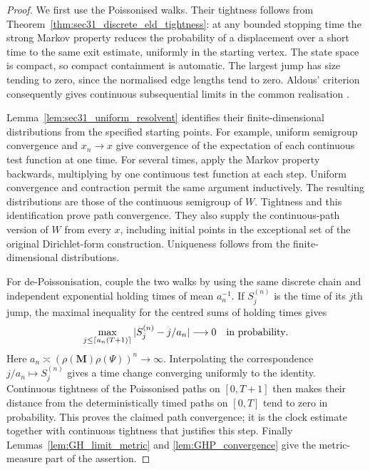 \documentclass{article}
\theoremstyle{plain}
\theoremstyle{definition}
\begin{document}
\begingroup\color{red}
\begin{proof}
We first use the Poissonised walks. Their tightness follows from
Theorem~\ref{thm:sec31_discrete_eld_tightness}: at any bounded stopping
time the strong Markov property reduces the probability of a displacement
over a short time to the same exit estimate, uniformly in the starting
vertex. The state space is compact, so compact containment is automatic.
The largest jump has size tending to zero, since the normalised edge
lengths tend to zero. Aldous' criterion consequently gives continuous
subsequential limits in the common realisation
\cite{aldous1978stopping,billingsley1999convergence}.

Lemma~\ref{lem:sec31_uniform_resolvent} identifies their finite-dimensional
distributions from the specified starting points. For example, uniform
semigroup convergence and $x_n\to x$ give convergence of the expectation
of each continuous test function at one time. For several times, apply
the Markov property backwards, multiplying by one continuous test
function at each step. Uniform convergence and contraction permit the
same argument inductively. The resulting distributions are those of the
continuous semigroup of $W$. Tightness and this identification prove
path convergence. They also supply the continuous-path version of $W$
from every $x$, including initial points in the exceptional set of the
original Dirichlet-form construction. Uniqueness follows from the
finite-dimensional distributions.

For de-Poissonisation, couple the two walks by using the same discrete
chain and independent exponential holding times of mean $a_n^{-1}$.
If $S_j^{(n)}$ is the time of its $j$th jump, the maximal inequality for
the centred sums of holding times gives
\[
\max_{j\le \lceil a_n(T+1)\rceil}
|S_j^{(n)}-j/a_n|\longrightarrow0
\quad\hbox{in probability}.
\]
Here $a_n\asymp(\rho(\mathbf M)\rho(\Psi))^n\to\infty$.
Interpolating the correspondence $j/a_n\mapsto S_j^{(n)}$ gives a time
change converging uniformly to the identity. Continuous tightness of
the Poissonised paths on $[0,T+1]$ then makes their distance from the
deterministically timed paths on $[0,T]$ tend to zero in probability.
This proves the claimed path convergence; it is the clock estimate
together with continuous tightness that justifies this step.
Finally Lemmas~\ref{lem:GH_limit_metric} and \ref{lem:GHP_convergence}
give the metric-measure part of the assertion.
\end{proof}
\endgroup{}
\end{document}

